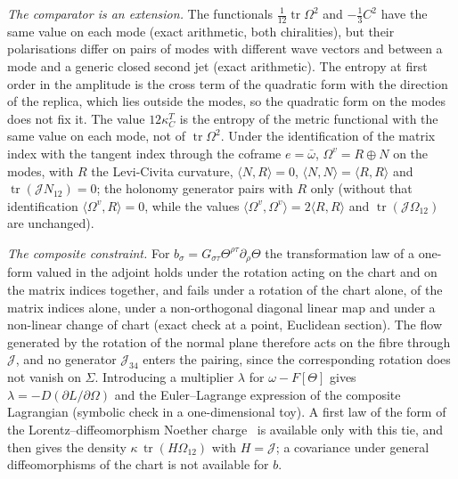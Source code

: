 \emph{The comparator is an extension.} The functionals \(\tfrac1{12}\operatorname{tr}\Omega^2\) and \(-\tfrac13C^2\) have the same value on each mode (exact arithmetic, both chiralities), but their polarisations differ on pairs of modes with different wave vectors and between a mode and a generic closed second jet (exact arithmetic). The entropy at first order in the amplitude is the cross term of the quadratic form with the direction of the replica, which lies outside the modes, so the quadratic form on the modes does not fix it. The value \(12\kappa_C^T\) is the entropy of the metric functional with the same value on each mode, not of \(\operatorname{tr}\Omega^2\). Under the identification of the matrix index with the tangent index through the coframe \(e=\bar\omega\), \(\Omega^v=R\oplus N\) on the modes, with \(R\) the Levi-Civita curvature, \(\langle N,R\rangle=0\), \(\langle N,N\rangle=\langle R,R\rangle\) and \(\operatorname{tr}(\mathcal J N_{12})=0\); the holonomy generator pairs with \(R\) only (without that identification \(\langle\Omega^v,R\rangle=0\), while the values \(\langle\Omega^v,\Omega^v\rangle=2\langle R,R\rangle\) and \(\operatorname{tr}(\mathcal J\Omega_{12})\) are unchanged).



\emph{The composite constraint.} For \(b_\sigma=G_{\sigma\tau}\Theta^{\rho\tau}\partial_\rho\Theta\) the transformation law of a one-form valued in the adjoint holds under the rotation acting on the chart and on the matrix indices together, and fails under a rotation of the chart alone, of the matrix indices alone, under a non-orthogonal diagonal linear map and under a non-linear change of chart (exact check at a point, Euclidean section). The flow generated by the rotation of the normal plane therefore acts on the fibre through \(\mathcal J\), and no generator \(\mathcal J_{34}\) enters the pairing, since the corresponding rotation does not vanish on \(\Sigma\). Introducing a multiplier \(\lambda\) for \(\omega-F[\Theta]\) gives \(\lambda=-D(\partial L/\partial\Omega)\) and the Euler--Lagrange expression of the composite Lagrangian (symbolic check in a one-dimensional toy). A first law of the form of the Lorentz--diffeomorphism Noether charge~\cite{JacobsonMohd2015} is available only with this tie, and then gives the density \(\kappa\,\operatorname{tr}(H\Omega_{12})\) with \(H=\mathcal J\); a covariance under general diffeomorphisms of the chart is not available for \(b\).



